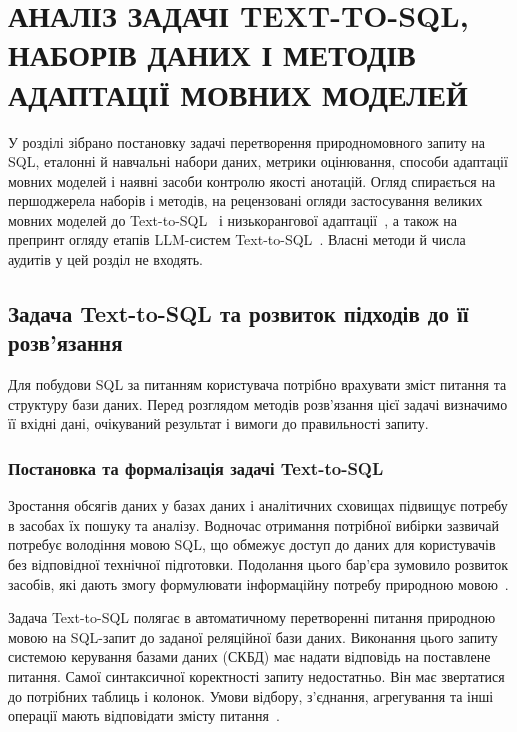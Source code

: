 \documentclass[a4paper,14pt,oneside]{extreport}
\begin{document}

\chapter{АНАЛІЗ ЗАДАЧІ TEXT-TO-SQL, НАБОРІВ ДАНИХ І МЕТОДІВ АДАПТАЦІЇ МОВНИХ МОДЕЛЕЙ}

У розділі зібрано постановку задачі перетворення природномовного запиту на SQL, еталонні й навчальні набори даних, метрики оцінювання, способи адаптації мовних моделей і наявні засоби контролю якості анотацій. Огляд спирається на першоджерела наборів і методів, на рецензовані огляди застосування великих мовних моделей до Text-to-SQL~\cite{shi2025survey} і низькорангової адаптації~\cite{mao2025lorasurvey}, а також на препринт огляду етапів LLM-систем Text-to-SQL~\cite{mohammadjafari2024review}. Власні методи й числа аудитів у цей розділ не входять.

\section{Задача Text-to-SQL та розвиток підходів до її розв’язання}

Для побудови SQL за питанням користувача потрібно врахувати зміст питання та структуру бази даних. Перед розглядом методів розв’язання цієї задачі визначимо її вхідні дані, очікуваний результат і вимоги до правильності запиту.

\subsection{Постановка та формалізація задачі Text-to-SQL}
\label{subsec:text2sql-formulation}

Зростання обсягів даних у базах даних і аналітичних сховищах підвищує потребу в засобах їх пошуку та аналізу. Водночас отримання потрібної вибірки зазвичай потребує володіння мовою SQL, що обмежує доступ до даних для користувачів без відповідної технічної підготовки. Подолання цього бар’єра зумовило розвиток засобів, які дають змогу формулювати інформаційну потребу природною мовою~\cite{mohammadjafari2024review}.

Задача Text-to-SQL полягає в автоматичному перетворенні питання природною мовою на SQL-запит до заданої реляційної бази даних. Виконання цього запиту системою керування базами даних (СКБД) має надати відповідь на поставлене питання. Самої синтаксичної коректності запиту недостатньо. Він має звертатися до потрібних таблиць і колонок. Умови відбору, з’єднання, агрегування та інші операції мають відповідати змісту питання~\cite{yu2018spider,li2023bird}.
\end{document}
